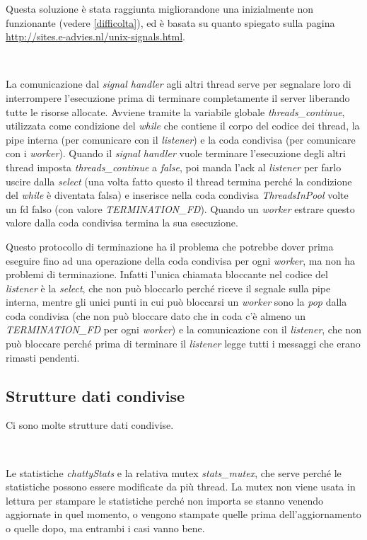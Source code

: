 \documentclass[a4paper]{article}
\theoremstyle{theorem}
\theoremstyle{remark}
\theoremstyle{definition}
\theoremstyle{corollary}
\theoremstyle{lemma}
\newcommand\codeName[1]{%
	\textit{#1}}
\begin{document}
Questa soluzione è stata raggiunta migliorandone una inizialmente non funzionante (vedere \autoref{difficolta}), ed è basata su quanto spiegato sulla pagina \url{http://sites.e-advies.nl/unix-signals.html}.

\

La comunicazione dal \codeName{signal handler} agli altri thread serve per segnalare loro di interrompere l'esecuzione prima di terminare completamente il server liberando tutte le risorse allocate. Avviene tramite la variabile globale \codeName{threads\_continue}, utilizzata come condizione del \codeName{while} che contiene il corpo del codice dei thread, la pipe interna (per comunicare con il \codeName{listener}) e la coda condivisa (per comunicare con i \codeName{worker}). Quando il \codeName{signal handler} vuole terminare l'esecuzione degli altri thread imposta \codeName{threads\_continue} a \codeName{false}, poi manda l'ack al \codeName{listener} per farlo uscire dalla \codeName{select} (una volta fatto questo il thread termina perché la condizione del \codeName{while} è diventata falsa) e inserisce nella coda condivisa \codeName{ThreadsInPool} volte un fd falso (con valore \codeName{TERMINATION\_FD}). Quando un \codeName{worker} estrare questo valore dalla coda condivisa termina la sua esecuzione.

Questo protocollo di terminazione ha il problema che potrebbe dover prima eseguire fino ad una operazione della coda condivisa per ogni \codeName{worker}, ma non ha problemi di terminazione. Infatti l'unica chiamata bloccante nel codice del \codeName{listener} è la \codeName{select}, che non può bloccarlo perché riceve il segnale sulla pipe interna, mentre gli unici punti in cui può bloccarsi un \codeName{worker} sono la \codeName{pop} dalla coda condivisa (che non può bloccare dato che in coda c'è almeno un \codeName{TERMINATION\_FD} per ogni \codeName{worker}) e la comunicazione con il \codeName{listener}, che non può bloccare perché prima di terminare il \codeName{listener} legge tutti i messaggi che erano rimasti pendenti.

\subsection{Strutture dati condivise}\label{strutture-dati}
Ci sono molte strutture dati condivise.

\

Le statistiche \codeName{chattyStats} e la relativa mutex \codeName{stats\_mutex}, che serve perché le statistiche possono essere modificate da più thread. La mutex non viene usata in lettura per stampare le statistiche perché non importa se stanno venendo aggiornate in quel momento, o vengono stampate quelle prima dell'aggiornamento o quelle dopo, ma entrambi i casi vanno bene.
\end{document}
